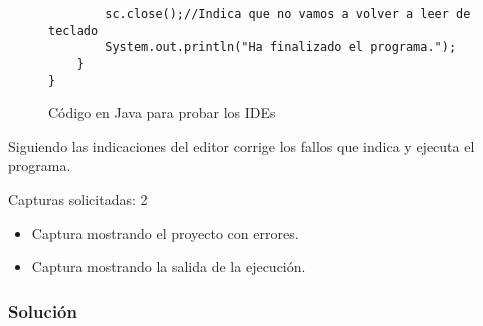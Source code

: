 \begin{figure}[H]
\begin{tcolorbox}[sharp corners, colback=yellow!30, colframe=white!20]
\begin{verbatim}
        sc.close();//Indica que no vamos a volver a leer de teclado
        System.out.println("Ha finalizado el programa.");
    }
}         \end{verbatim}
    \end{tcolorbox}
    \caption{Código en Java para probar los IDEs}
\end{figure}

Siguiendo las indicaciones del editor corrige los fallos que indica y ejecuta el programa.

Capturas solicitadas: 2
\begin{itemize}
    \item Captura mostrando el proyecto con errores.
    \item Captura mostrando la salida de la ejecución.
\end{itemize}

\subsubsection{Solución}







\newpage



